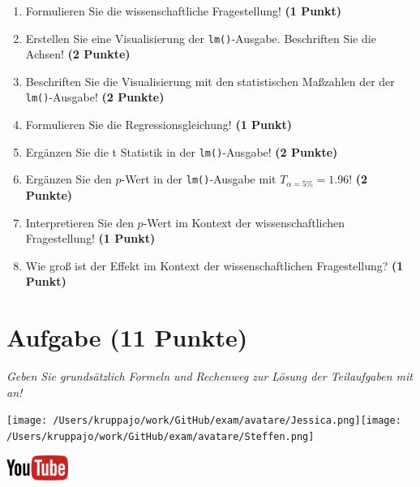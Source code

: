 \documentclass[a4paper, 9pt]{scrartcl}\usepackage[]{graphicx}\usepackage[]{xcolor}
\begin{document}
\begin{enumerate}
\item Formulieren Sie die wissenschaftliche Fragestellung! \textbf{(1 Punkt)}
\item Erstellen  Sie  eine  Visualisierung  der \texttt{lm()}-Ausgabe.  Beschriften  Sie  die  Achsen! \textbf{(2 Punkte)}
\item Beschriften Sie die Visualisierung mit den statistischen Maßzahlen der der \texttt{lm()}-Ausgabe! \textbf{(2 Punkte)}
\item Formulieren Sie die Regressionsgleichung! \textbf{(1 Punkt)}
\item Ergänzen Sie die t Statistik in der \texttt{lm()}-Ausgabe! \textbf{(2 Punkte)}
\item Ergänzen Sie den $p$-Wert in der \texttt{lm()}-Ausgabe mit $T_{\alpha = 5\%} = 1.96$!  \textbf{(2 Punkte)}
\item Interpretieren Sie den $p$-Wert im Kontext der wissenschaftlichen Fragestellung! \textbf{(1 Punkt)}  
\item Wie groß ist der Effekt im Kontext der wissenschaftlichen Fragestellung? \textbf{(1 Punkt)}
\end{enumerate} 
\clearpage

\section{Aufgabe \hfill (11 Punkte)}

\textit{Geben Sie grundsätzlich Formeln und Rechenweg zur Lösung der Teilaufgaben mit an!} \\[1Ex]
 

 
\begin{minipage}[t]{0.5\textwidth}
\texttt{[image: /Users/kruppajo/work/GitHub/exam/avatare/Jessica.png]}\hspace{-4mm}\texttt{[image: /Users/kruppajo/work/GitHub/exam/avatare/Steffen.png]}
\end{minipage}
\begin{minipage}[t]{0.5\textwidth}
\hfill
\href{https://youtu.be/tNNzcndrpSk}{\includegraphics[width = 2cm]{img/youtube}}
\end{minipage}
\vspace{1ex}
\end{document}
